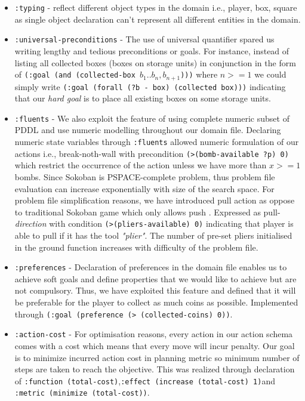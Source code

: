 \documentclass[letterpaper]{article} %
\begin{document}
\begin{itemize}
\item \texttt{:typing} - reflect different object types in the domain i.e., player, box, square as single object declaration can’t represent all different entities in the domain.
\item \texttt{:universal-preconditions} - The use of universal quantifier spared us writing lengthy and tedious preconditions or goals. For instance, instead of listing all collected boxes (boxes on storage units) in conjunction in the form of \texttt{(:goal (and (collected-box \(b_1 ..b_n, b_{n+1}\))))} where \(n >= 1\) we could simply write \texttt{(:goal (forall (?b - box) (collected box)))} indicating that our \emph{hard goal} is to place all existing boxes on some storage units.
\item \texttt{:fluents} - We also exploit the feature of using complete numeric subset of PDDL and use numeric modelling throughout our domain file. Declaring numeric state variables through \texttt{:fluents} allowed numeric formulation of our actions i.e., break-noth-wall with precondition
\texttt{(>(bomb-available ?p) 0)} which restrict the occurrence of the action unless we have more than \(x >= 1\) bombs. Since Sokoban is PSPACE-complete problem, thus problem file evaluation can increase exponentially with size of the search space. For problem file simplification reasons, we have introduced pull action as oppose to traditional Sokoban game which only allows push . Expressed as pull-\emph{direction} with condition \texttt{(>(pliers-available) 0)} indicating that player is able to pull if it has the tool \emph{"plier"}. The number of pre-set pliers initialised in the ground function increases with difficulty of the problem file.  
\item \texttt{:preferences} - Declaration of preferences in the domain file enables us to achieve soft goals and define properties that we would like to achieve but are not compulsory. Thus, we have exploited this feature and defined that it will be preferable for the player to collect as much coins as possible. Implemented through \texttt{(:goal (preference (> (collected-coins) 0))}.
\item \texttt{:action-cost} -  For optimisation reasons, every action in our action schema comes with  a cost which means that every move will incur penalty.  Our goal is to minimize incurred action cost in planning metric so minimum number of steps are taken to reach the objective.  This was realized through declaration of \texttt{:function (total-cost)},\texttt{:effect (increase (total-cost) 1)}and\texttt{ :metric (minimize (total-cost))}. 
\end{itemize}
\end{document}
